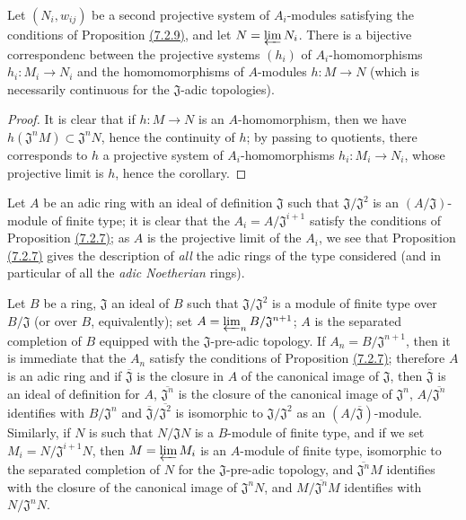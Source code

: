 \begin{cor}[7.2.10]
\label{cor-0.7.2.10}
Let $(N_i,w_{ij})$ be a second projective system of $A_i$-modules satisfying the conditions
of Proposition \hyperref[prop-0.7.2.9]{(7.2.9)}, and let $N=\varprojlim N_i$. There is a
bijective correspondenc between the projective systems $(h_i)$ of $A_i$-homomorphisms
$h_i:M_i\to N_i$ and the homomomorphisms of $A$-modules $h:M\to N$ (which is necessarily
continuous for the $\mathfrak{J}$-adic topologies).
\end{cor}

\begin{proof}
\label{proof-cor-0.7.2.10}
It is clear that if $h:M\to N$ is an $A$-homomorphism, then we have
$h(\mathfrak{J}^n M)\subset\mathfrak{J}^n N$, hence the continuity of $h$; by passing to
quotients, there corresponds to $h$ a projective system of $A_i$-homomorphisms
$h_i:M_i\to N_i$, whose projective limit is $h$, hence the corollary.
\end{proof}

\begin{rmk}[7.2.11]
\label{rmk-0.7.2.11}
Let $A$ be an adic ring with an ideal of definition $\mathfrak{J}$ such that
$\mathfrak{J}/\mathfrak{J}^2$ is an $(A/\mathfrak{J})$-module of finite type; it is clear
that the $A_i=A/\mathfrak{J}^{i+1}$ satisfy
the conditions of Proposition \hyperref[prop-0.7.2.7]{(7.2.7)}; as $A$ is the projective
limit of the $A_i$, we see that Proposition \hyperref[prop-0.7.2.7]{(7.2.7)} gives the
description of {\em all} the adic rings of the type considered (and in particular of all
the {\em adic Noetherian} rings).
\end{rmk}

\begin{exm}[7.2.12]
\label{exm-0.7.2.12}
Let $B$ be a ring, $\mathfrak{J}$ an ideal of $B$ such that $\mathfrak{J}/\mathfrak{J}^2$ is
a module of finite type over $B/\mathfrak{J}$ (or over $B$, equivalently); set
$A=\varprojlim_n B/\mathfrak{J}^{n+1}$; $A$ is the separated completion of $B$ equipped with
the $\mathfrak{J}$-pre-adic topology. If $A_n=B/\mathfrak{J}^{n+1}$, then it is immediate
that the $A_n$ satisfy the conditions of Proposition \hyperref[prop-0.7.2.7]{(7.2.7)};
therefore $A$ is an adic ring and if $\overline{\mathfrak{J}}$ is the closure in $A$ of the
canonical image of $\mathfrak{J}$, then $\overline{\mathfrak{J}}$ is an ideal of definition
for $A$, $\overline{\mathfrak{J}^n}$ is the closure of the canonical image of
$\mathfrak{J}^n$, $A/\overline{\mathfrak{J}^n}$ identifies with $B/\mathfrak{J}^n$ and
$\overline{\mathfrak{J}}/\overline{\mathfrak{J}^2}$ is isomorphic to
$\mathfrak{J}/\mathfrak{J}^2$ as an $(A/\overline{\mathfrak{J}})$-module. Similarly, if $N$
is such that $N/\mathfrak{J}N$ is a $B$-module of finite type, and if we set
$M_i=N/\mathfrak{J}^{i+1}N$, then $M=\varprojlim M_i$ is an $A$-module of finite type,
isomorphic to the separated completion of $N$ for the $\mathfrak{J}$-pre-adic topology, and
$\overline{\mathfrak{J}^n}M$ identifies with the closure of the canonical image of
$\mathfrak{J}^n N$, and $M/\overline{\mathfrak{J}^n}M$ identifies with
$N/\mathfrak{J}^n N$.
\end{exm}

